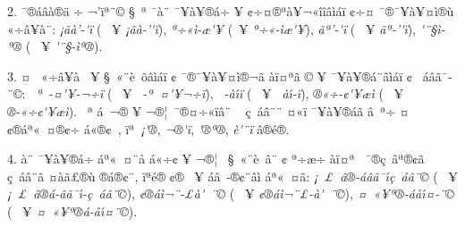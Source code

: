 \documentclass[12pt,a4paper]{article}
\begin{document}
2. ^^80^^af^^ae^^e1^^e2^^e0^^ae^^e4 ^^f7 ^^ac'^^ef^^aa^^a8^^a9 ^^a7^^ad^^a0^^aa ^^af^^e0^^a8 ^^af^^a5^^e0^^a5^^ad^^ae^^e1^^f7 ^^ad^^a5 ^^a2^^f7^^a4^^ae^^aa^^e0^^a5^^ac^^ab^^ee^^ee^^e2^^ec\-^^e1^^ef ^^a2^^f7^^a4
^^af^^ae^^af^^a5^^e0^^a5^^a4^^ad^^ec^^ae^^f9 ^^ab^^f7^^e2^^a5^^e0^^a8: \emph{^^a1^^e3^^e0'-\'^^ef^^ad} (^^a0 ^^ad^^a5 \emph{^^a1^^e3^^e0-'\'^^ef^^ad}), \emph{^^aa^^f7^^ab^^ec-^^e6\'^^a5}
(^^a0\linebreak ^^ad^^a5 \emph{^^aa^^f7^^ab-^^ec^^e6\'^^a5}), \emph{^^8b^^e3^^aa'-\'^^ef^^ad} (^^a0 ^^ad^^a5 \emph{^^8b^^e3^^aa-'\'^^ef^^ad}),
\emph{^^ad\'^^a8^^a7^^ec-^^aa^^ae} (^^a0 ^^ad^^a5 \emph{^^ad\'^^a8^^a7-^^ec^^aa^^ae}).

3. ^^8e^^a4^^ad^^a0 ^^ab^^f7^^e2^^a5^^e0^^a0 ^^ad^^a5 ^^a7^^a0^^ab^^a8^^e8^^a0^^f5^^e2^^ec^^e1^^ef ^^a2 ^^af^^ae^^af^^a5^^e0^^a5^^a4^^ad^^ec^^ae^^ac^^e3 ^^e0^^ef^^a4^^aa^^e3 ^^a9 ^^ad^^a5\linebreak
^^af^^a5^^e0^^a5^^ad^^ae^^e1^^a8^^e2^^ec^^e1^^ef ^^a2 ^^ad^^a0^^e1^^e2^^e3^^af^^ad^^a8^^a9: \emph{^^a0^^aa^^a0-^^a4\'^^a5-^^ac^^f7^^ef} (^^a0 ^^ad^^a5 \emph{^^a0-^^aa^^a0^^a4\'^^a5^^ac^^f7^^ef}),
\emph{^^8c^^a0-\linebreak{}^^e0\'\i^^ef} (^^a0 ^^ad^^a5 \emph{^^8c^^a0^^e0\'\i-^^ef}), \emph{^^ae^^ab^^f7-^^a2\'^^a5^^e6^^ec} (^^a0 ^^ad^^a5
\emph{^^ae-^^ab^^f7^^a2\'^^a5^^e6^^ec}). ^^92^^a0^^aa ^^e1^^a0^^ac^^ae ^^ad^^a5 ^^ac^^ae^^a6^^ad^^a0\linebreak ^^af^^ae^^a4^^f7^^ab^^ef^^e2^^a8 ^^ad^^a0 ^^e7^^a0^^e1^^e2^^a8^^ad^^a8 ^^a4^^ab^^ef ^^af^^a5^^e0^^a5^^ad^^ae^^e1^^e3
^^e2^^a0^^aa^^f7 ^^a4^^a2^^ae^^e1^^aa^^ab^^a0^^a4^^ae^^a2^^f7 ^^e1^^ab^^ae^^a2^^a0, ^^ef^^aa\linebreak \emph{^^a0^^a1\'^^ae}, \emph{^^ac^^ae\'^^ef}, \emph{\'^^ae^^aa^^ae},
\emph{^^e8\'^^a8^^ef} ^^e2^^ae^^e9^^ae.

4. ^^8f^^e0^^a8 ^^af^^a5^^e0^^a5^^ad^^ae^^e1^^f7 ^^e1^^aa^^ab^^a0^^a4^^ad^^a8^^e5 ^^e1^^ab^^f7^^a2 ^^ad^^a5 ^^ac^^ae^^a6^^ad^^a0 ^^a7^^a0^^ab^^a8^^e8^^a0^^e2^^a8 ^^a2 ^^aa^^f7^^ad\/^^e6^^f7 ^^e0^^ef^^a4^^aa^^a0
^^af^^ae^^e7^^a0^^e2^^aa^^ae^^a2^^e3 ^^e7^^a0^^e1^^e2^^a8^^ad^^e3 ^^a4^^e0^^e3^^a3^^ae^^f9 ^^ae^^e1^^ad^^ae^^a2^^a8, ^^ef^^aa^^e9^^ae ^^a2^^ae^^ad^^a0 ^^ad^^a5 ^^e1^^e2^^a0-\linebreak{}^^ad^^ae^^a2^^a8^^e2^^ec ^^e1^^aa^^ab^^a0^^a4^^e3:
\emph{^^a1^^a0^^a3^^a0^^e2^^ae-^^e1^^e2^^e3^^af\'\i^^ad^^e7^^a0^^e1^^e2^^a8^^a9} (^^a0 ^^ad^^a5 \emph{^^a1^^a0^^a3^^a0^^e2^^ae^^e1-^^e2^^e3^^af\'\i^^ad-\linebreak{}^^e7^^a0^^e1^^e2^^a8^^a9}),
\emph{^^a2^^ae^^e1^^ec^^ac^^a8-^^a3^^e0\'^^a0^^ad\-^^ad^^a8^^a9} (^^a0 ^^ad^^a5 \emph{^^a2^^ae^^e1^^ec^^ac^^a8^^a3-^^e0\'^^a0^^ad^^ad^^a8^^a9}),
\emph{^^a4^^a0^^ab^^a5^^aa^^ae-^^e1^^e5\'\i^^a4-^^ad^^a8^^a9} (^^a0 ^^ad^^a5 \emph{^^a4^^a0^^ab^^a5^^aa^^ae^^e1-^^e5\'\i^^a4^^ad^^a8^^a9}).
\end{document}
